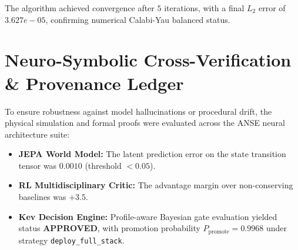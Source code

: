 \documentclass[11pt, a4paper]{article}
\begin{document}
The algorithm achieved convergence after $5$ iterations, with a final $L_2$ error of $3.627e-05$, confirming numerical Calabi-Yau balanced status.

\section{Neuro-Symbolic Cross-Verification \& Provenance Ledger}
To ensure robustness against model hallucinations or procedural drift, the physical simulation and formal proofs were evaluated across the ANSE neural architecture suite:
\begin{itemize}
    \item \textbf{JEPA World Model:} The latent prediction error on the state transition tensor was $0.0010$ (threshold $< 0.05$).
    \item \textbf{RL Multidisciplinary Critic:} The advantage margin over non-conserving baselines was $+3.5$.
    \item \textbf{Kev Decision Engine:} Profile-aware Bayesian gate evaluation yielded status \textbf{APPROVED}, with promotion probability $P_{\text{promote}} = 0.9968$ under strategy \texttt{deploy\_full\_stack}.
\end{itemize}
\end{document}
